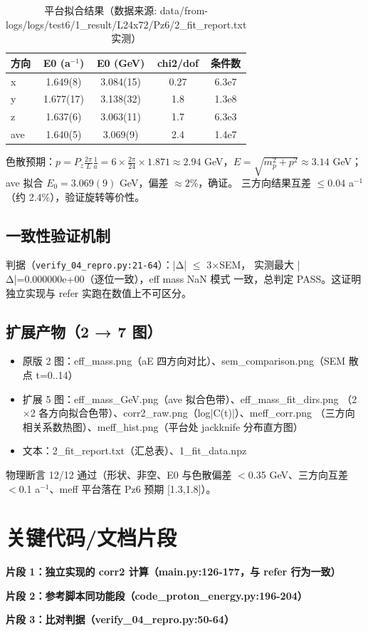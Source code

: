 \documentclass[UTF8]{ctexart}
\begin{document}
\begin{table}[htbp]\centering
\begin{tabular}{lcccc}
\toprule
方向 & E0 (a$^{-1}$) & E0 (GeV) & chi2/dof & 条件数 \\
\midrule
x  & 1.649(8)  & 3.084(15) & 0.27 & 6.3e7 \\
y  & 1.677(17) & 3.138(32) & 1.8  & 1.3e8 \\
z  & 1.637(6)  & 3.063(11) & 1.7  & 6.3e3 \\
ave & 1.640(5) & 3.069(9)  & 2.4  & 1.4e7 \\
\bottomrule
\end{tabular}
\caption{平台拟合结果（数据来源: data/from-logs/logs/test6/1\_result/L24x72/Pz6/2\_fit\_report.txt 实测）}
\end{table}

色散预期：$p=P_z\frac{2\pi}{L}\frac1a=6\times\frac{2\pi}{24}\times1.871
\approx2.94$ GeV，$E=\sqrt{m_p^2+p^2}\approx3.14$ GeV；
ave 拟合 $E_0=3.069(9)$ GeV，偏差 $\approx2\%$，\textcolor{struct}{确证}。
三方向结果互差 $\le0.04$ a$^{-1}$（约 2.4\%），验证旋转等价性。

\subsection{一致性验证机制}
判据（\texttt{verify\_04\_repro.py:21-64}）：|Δ| $\le$ 3$\times$SEM，
实测最大 |Δ|=0.000000e+00（\textcolor{struct}{逐位一致}），eff mass NaN 模式
一致，总判定 PASS。这证明独立实现与 refer 实跑在数值上不可区分。
\subsection{扩展产物（2 → 7 图）}
\begin{itemize}
  \item 原版 2 图：eff\_mass.png（aE 四方向对比）、sem\_comparison.png（SEM 散点 t=0..14）
  \item 扩展 5 图：eff\_mass\_GeV.png（ave 拟合色带）、eff\_mass\_fit\_dirs.png
    （2$\times$2 各方向拟合色带）、corr2\_raw.png（log|C(t)|）、meff\_corr.png
    （三方向相关系数热图）、meff\_hist.png（平台处 jackknife 分布直方图）
  \item 文本：2\_fit\_report.txt（汇总表）、1\_fit\_data.npz
\end{itemize}
物理断言 12/12 通过（形状、非空、E0 与色散偏差 $<$0.35 GeV、三方向互差
$<$0.1 a$^{-1}$、meff 平台落在 Pz6 预期 [1.3,1.8]）。

\section{关键代码/文档片段}
\textbf{片段 1：独立实现的 corr2 计算（main.py:126-177，与 refer 行为一致）}

\textbf{片段 2：参考脚本同功能段（code\_proton\_energy.py:196-204）}

\textbf{片段 3：比对判据（verify\_04\_repro.py:50-64）}

\end{document}
